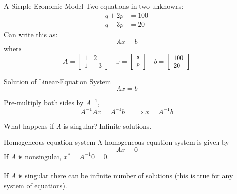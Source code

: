 \documentclass{./../../Latex/teaching_slides}
\begin{document}
\begin{frame}{A Simple Economic Model}
Two equations in two unknowns:
\begin{align*}
q + 2p &= 100 \\ q-3p &= 20
\end{align*}
Can write this as:
$$ Ax = b $$
where
$$A = \begin{bmatrix}
1 & 2 \\
1 & -3 
\end{bmatrix} \quad 
x = \begin{bmatrix}
q \\
p 
\end{bmatrix} \quad 
b = \begin{bmatrix}
100 \\
20 
\end{bmatrix}$$
\end{frame}

\begin{frame}{Solution of Linear-Equation System}
$$ Ax = b $$

\vspace{0.5em}
Pre-multiply both sides by $A^{-1}$, 
$$ A^{-1} Ax = A^{-1} b \quad \implies x = A^{-1} b $$

What happens if $A$ is singular? Infinite solutions.
\end{frame}

\begin{frame}{Homogeneous equation system}
A homogeneous equation system is given by 
$$ Ax = 0$$
If $A$ is nonsingular, $x^* = A^{-1} 0 = 0$. \\~\\
 If $A$ is singular there can be infinite number of solutions (this is true for any system of equations).
\end{frame}
\end{document}
